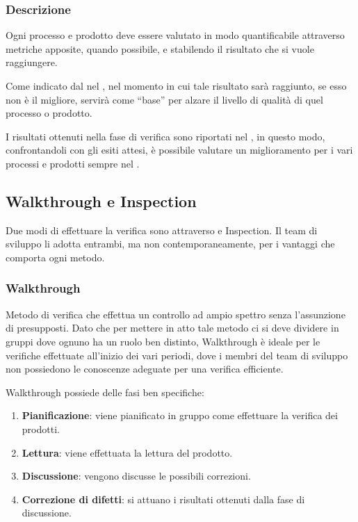 
		\subsubsection{Descrizione}
		Ogni processo e prodotto deve essere valutato in modo quantificabile attraverso metriche apposite, quando possibile, e stabilendo il risultato che si vuole raggiungere.

		Come indicato dal  nel \Doc{\PdQv}, nel momento in cui tale risultato sarà raggiunto, se esso non è il migliore,
		servirà come ``base'' per alzare il livello di qualità di quel processo o prodotto.

		I risultati ottenuti nella fase di verifica sono riportati nel \PdQ, in questo modo, confrontandoli con gli esiti attesi,
		è possibile valutare un miglioramento per i vari processi e prodotti sempre nel \PdQ.

		\subsection{Walkthrough e Inspection}
		Due modi di effettuare la verifica sono attraverso  e Inspection.
		Il team di sviluppo li adotta entrambi, ma non contemporaneamente, per i vantaggi che comporta ogni metodo.

			\subsubsection{Walkthrough}
			Metodo di verifica che effettua un controllo ad ampio spettro senza l’assunzione di presupposti. Dato che per mettere in atto tale metodo ci
			si deve dividere in gruppi dove ognuno ha un ruolo ben distinto, Walkthrough è ideale per le verifiche effettuate all'inizio dei vari periodi,
			dove i membri del team di sviluppo non possiedono le conoscenze adeguate per una verifica efficiente.

			Walkthrough possiede delle fasi ben specifiche:

			\begin{enumerate}
				\item \textbf{Pianificazione}: viene pianificato in gruppo come effettuare la verifica dei prodotti.
				\item \textbf{Lettura}: viene effettuata la lettura del prodotto.
				\item \textbf{Discussione}: vengono discusse le possibili correzioni.
				\item \textbf{Correzione di difetti}: si attuano i risultati ottenuti dalla fase di discussione.
			\end{enumerate}


